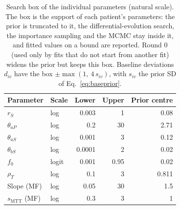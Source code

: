 \begin{table}[!htbp]
\centering
\small
\setlength{\tabcolsep}{3.5pt}
\caption{Search box of the individual parameters (natural scale). The box is the support of each patient's parameters: the prior is truncated to it, the differential-evolution search, the importance sampling and the MCMC stay inside it, and fitted values on a bound are reported. Round 0 (used only by fits that do not start from another fit) widens the prior but keeps this box. Baseline deviations $d_{iv}$ have the box $\pm\max(1,\ 4\,s_{iv})$, with $s_{iv}$ the prior SD of Eq.~\ref{eq:baseprior}.}
\label{tab:box}
\begin{tabular}{llrrr}
\toprule
Parameter & Scale & Lower & Upper & Prior centre \\
\midrule
$r_S$ & log & 0.003 & 1 & 0.08 \\
$\theta_{aP}$ & log & 0.2 & 30 & 2.71 \\
$\theta_{aS}$ & log & 0.001 & 3 & 0.12 \\
$\theta_{bS}$ & log & 0.0001 & 2 & 0.02 \\
$f_0$ & logit & 0.001 & 0.95 & 0.02 \\
$\rho_T$ & log & 0.1 & 3 & 0.811 \\
Slope (MF) & log & 0.05 & 30 & 1.5 \\
$s_{\mathrm{MTT}}$ (MF) & log & 0.3 & 3 & 1 \\
\bottomrule
\end{tabular}
\end{table}
